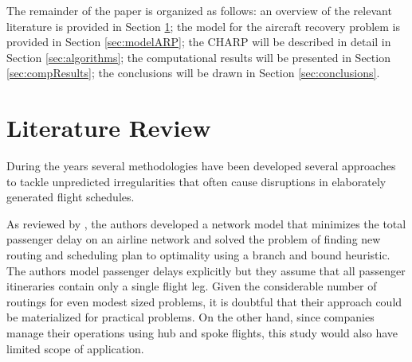 \documentclass[ijoo,nonblindrev]{informs-ijoo}
\begin{document}
The remainder of the paper is organized as follows: an overview of the relevant literature is provided in Section \ref{sec:litRev}; the model for the aircraft  recovery problem is provided in Section \ref{sec:modelARP}; the  CHARP will be described in detail in Section \ref{sec:algorithms}; the computational results will be presented in Section \ref{sec:compResults}; the conclusions will be drawn in Section \ref{sec:conclusions}.


\section{Literature Review}\label{sec:litRev}


During the years several methodologies have been developed several approaches to tackle unpredicted irregularities that often cause disruptions in elaborately generated flight schedules.
 
\begin{comment}
 We first present in Section} \ref{sec:aircRecovery} \hl{an extensive literature review regarding the different methods used in the past thirty five years to perform aircraft recovery. In Section} \ref{sec:integratedRecovery} \hl{ we focus in reviewing the the methods that integrate the the ARP with passenger recovery problem (PRP), in particular, since we are using the ROADEF 2009 Challenge data sets, we will provide the literature review of the methods used in this competition.}
\subsection{Aircraft Recovery}\label{sec:aircRecovery}
\end{comment}
As reviewed by \citep{TEODOROVIC1984}, the authors developed a network model that minimizes the total passenger delay on an airline network and solved the problem of finding new routing and scheduling plan to optimality using a branch and bound heuristic. The authors model passenger delays explicitly but they assume that all passenger itineraries contain only a single flight leg. Given the considerable number of routings for even modest sized problems, it is doubtful that their approach could be materialized for practical problems. On the other hand, since companies manage their operations using hub and spoke flights, this study would also have limited scope of application.
\end{document}
